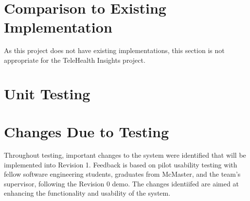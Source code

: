 \documentclass[12pt, titlepage]{article}
\begin{document}
\section{Comparison to Existing Implementation}	

As this project does not have existing implementations, this section is not appropriate for the TeleHealth Insights project.

\section{Unit Testing}

\section{Changes Due to Testing}

\hspace{2em} Throughout testing, important changes to the system were identified that will be implemented into Revision 1.
Feedback is based on pilot usability testing with fellow software engineering students, graduates from McMaster, and the team's
supervisor, following the Revision 0 demo. The changes identiifed are aimed at enhancing the functionality and usability of the system.
\end{document}
